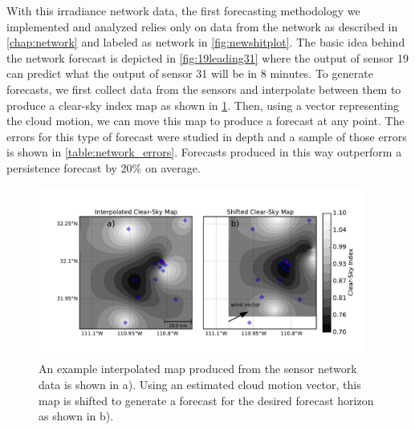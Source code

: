 With this irradiance network data, the first forecasting methodology
we implemented and analyzed relies only on data from the network as
described in \cref{chap:network} and labeled as network in
\cref{fig:newshitplot}.
The basic idea behind the network forecast is depicted in
\cref{fig:19leading31} where the output of sensor 19 can predict what
the output of sensor 31 will be in 8 minutes.
To generate forecasts, we first collect data from the sensors and
interpolate between them to produce a clear-sky index map as shown in
\cref{fig:clearmap}.
Then, using a vector representing the cloud motion, we can move this
map to produce a forecast at any point.
The errors for this type of forecast were studied in depth and a
sample of those errors is shown in \cref{table:network_errors}.
Forecasts produced in this way outperform a persistence forecast by
20\% on average.

\begin{figure}[hbtp]
\centering
\includegraphics[width=0.96\textwidth]{figs/clearmap.pdf}
\caption[Illustration of the network forecast methodology]{An example
  interpolated map produced from the sensor network data is shown in
  a). Using an estimated cloud motion vector, this map is shifted
  to generate a forecast for the desired forecast horizon as shown in b).}
\label{fig:clearmap}
\end{figure}

